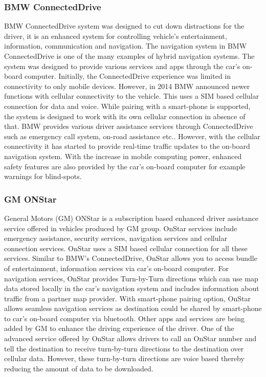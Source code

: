 \subsubsection{BMW ConnectedDrive}
BMW ConnectedDrive \cite{bmwcd} system was designed to cut down distractions for the driver, it is an enhanced system for controlling vehicle's entertainment, information, communication and navigation. The navigation system in BMW ConnectedDrive is one of the many examples of hybrid navigation systems. The system was designed to provide various services and apps through the car's on-board computer. Initially, the ConnectedDrive experience was limited in connectivity to only mobile devices. However, in 2014 BMW announced newer functions with cellular connectivity to the vehicle. This uses a SIM based cellular connection for data and voice. While pairing with a smart-phone is supported, the system is designed to work with its own cellular connection in absence of that. BMW provides various driver assistance services through ConnectedDrive such as emergency call system, on-road assistance etc.. However, with the cellular connectivity it has started to provide real-time traffic updates to the on-board navigation system. With the increase in mobile computing power, enhanced safety features are also provided by the car's on-board computer for example warnings for blind-spots.


\subsubsection{GM ONStar}
General Motors (GM) ONStar \cite{barabba2002multimethod} is a subscription based enhanced driver assistance service offered in vehicles produced by GM group. OnStar services include emergency assistance, security services, navigation services and cellular connection services. OnStar uses a SIM based cellular connection for all these services. Similar to BMW's ConnectedDrive, OnStar allows you to access bundle of entertainment, information services via car's on-board computer. For navigation services, OnStar provides Turn-by-Turn directions which can use map data stored locally in the car's navigation system and includes information about traffic from a partner map provider. With smart-phone pairing option, OnStar allows seamless navigation services as destination could be shared by smart-phone to car's on-board computer via bluetooth. Other apps and services are being added by GM to enhance the driving experience of the driver. One of the advanced service offered by OnStar allows drivers to call an OnStar number and tell the destination to receive turn-by-turn directions to the destination over cellular data. However, these turn-by-turn directions are voice based thereby reducing the amount of data to be downloaded. 

